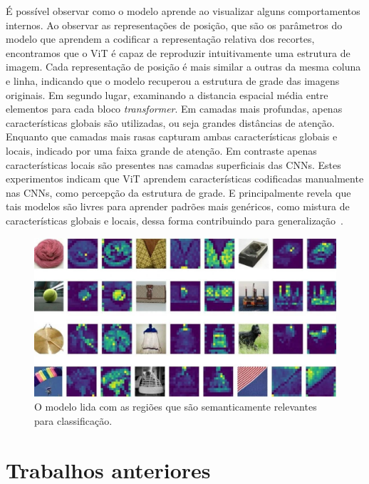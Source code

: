 É possível observar como o modelo aprende ao visualizar alguns comportamentos internos. Ao observar as representações de posição, que são os parâmetros do modelo que aprendem a codificar a representação relativa dos recortes, encontramos que o ViT é capaz de reproduzir intuitivamente uma estrutura de imagem. Cada representação de posição é mais similar a outras da mesma coluna e linha, indicando que o modelo recuperou a estrutura de grade das imagens originais. Em segundo lugar, examinando a distancia espacial média entre elementos para cada bloco \textit{transformer}. Em camadas mais profundas, apenas características globais são utilizadas, ou seja grandes distâncias de atenção. Enquanto que camadas mais rasas capturam ambas características globais e locais, indicado por uma faixa grande de atenção. Em contraste apenas características locais são presentes nas camadas superficiais das CNNs. Estes experimentos indicam que ViT aprendem características codificadas manualmente nas CNNs, como percepção da estrutura de grade. E principalmente revela que tais modelos são livres para aprender padrões mais genéricos, como mistura de características globais e locais, dessa forma contribuindo para generalização~\cite{dosovitskiy2020image}.
 

\begin{figure}[!ht]
    \centering
    \includegraphics[width=\columnwidth]{
        Imagens/visualizing-attention-vit.jpg
    }
    \caption{
O modelo lida com as regiões que são semanticamente relevantes para classificação. \cite{ViTvsResNets}
        }
    \label{fig:ViTVisualizationAttention}
\end{figure}



\section{Trabalhos anteriores}\label{sec:Cap2_revisao_literatura}

